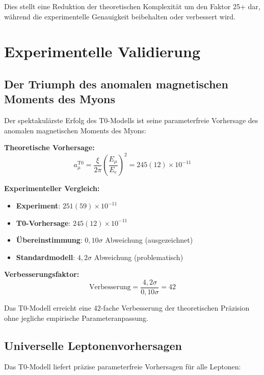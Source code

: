 \documentclass[12pt,a4paper]{report}
\begin{document}
	Dies stellt eine Reduktion der theoretischen Komplexität um den Faktor 25+ dar, während die experimentelle Genauigkeit beibehalten oder verbessert wird.
	
	\section{Experimentelle Validierung}
	\label{sec:experimental_validation}
	
	\subsection{Der Triumph des anomalen magnetischen Moments des Myons}
	\label{subsec:muon_triumph}
	
	Der spektakulärste Erfolg des T0-Modells ist seine parameterfreie Vorhersage des anomalen magnetischen Moments des Myons:
	
	\textbf{Theoretische Vorhersage:}
	\begin{equation}
		a_\mu^{\text{T0}} = \frac{\xi}{2\pi} \left(\frac{E_\mu}{E_e}\right)^2 = 245(12) \times 10^{-11}
	\end{equation}
	
	\textbf{Experimenteller Vergleich:}
	\begin{itemize}
		\item \textbf{Experiment}: $251(59) \times 10^{-11}$
		\item \textbf{T0-Vorhersage}: $245(12) \times 10^{-11}$
		\item \textbf{Übereinstimmung}: $0,10\sigma$ Abweichung (ausgezeichnet)
		\item \textbf{Standardmodell}: $4,2\sigma$ Abweichung (problematisch)
	\end{itemize}
	
	\textbf{Verbesserungsfaktor:}
	\begin{equation}
		\text{Verbesserung} = \frac{4,2\sigma}{0,10\sigma} = 42
	\end{equation}
	
	Das T0-Modell erreicht eine 42-fache Verbesserung der theoretischen Präzision ohne jegliche empirische Parameteranpassung.
	
	\subsection{Universelle Leptonenvorhersagen}
	\label{subsec:universal_lepton_predictions}
	
	Das T0-Modell liefert präzise parameterfreie Vorhersagen für alle Leptonen:
	
\end{document}
